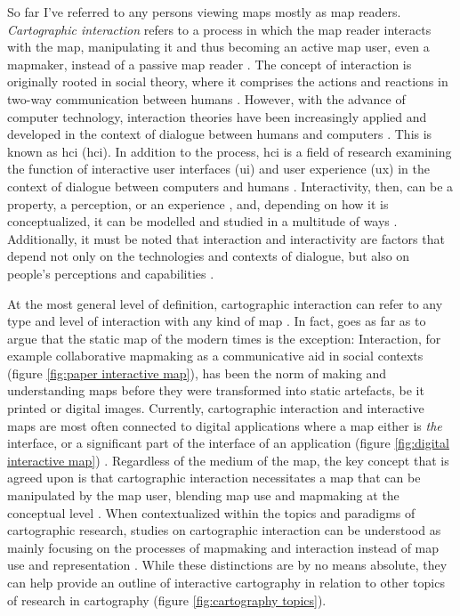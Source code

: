 So far I've referred to any persons viewing maps mostly as map readers.
\textit{Cartographic interaction} refers to a process
in which the map reader interacts with the map,
manipulating it and thus becoming an active map user, even a mapmaker,
instead of a passive map reader \parencite{rot2017}.
The concept of interaction is originally rooted in social theory,
where it comprises the actions and reactions in
two-way communication between humans \parencite{ken1996}.
However, with the advance of computer technology,
interaction theories have been increasingly applied and developed
in the context of dialogue between humans and computers \parencite{qui2008}.
This is known as \acrlong{hci} (\acrshort{hci}).
In addition to the process, \acrshort{hci} is a field of research examining
the function of interactive user interfaces (\acrshort{ui})
and user experience (\acrshort{ux})
in the context of dialogue between computers and humans \parencite{car1997, hor2017}.
Interactivity, then, can be
a property, a perception, or an experience \parencite{lan2023},
and, depending on how it is conceptualized,
it can be modelled and studied in a multitude of ways \parencite{smu2009}.
Additionally, it must be noted that interaction and interactivity are factors
that depend not only on the technologies and
contexts of dialogue, but also on people’s perceptions and capabilities
\parencite{kio2002, duc2018}.

At the most general level of definition,
cartographic interaction can refer to
any type and level of interaction with any kind of map \parencite{pet1998}.
In fact, \citeauthor{pet1998} goes as far as to argue
that the static map of the modern times is the exception:
Interaction, for example collaborative mapmaking
as a communicative aid in social contexts
(figure \ref{fig:paper interactive map}),
has been the norm of making and understanding maps
before they were transformed into static artefacts,
be it printed or digital images.
Currently, cartographic interaction and interactive maps
are most often connected to digital applications
where a map either is \textit{the} interface,
or a significant part of the interface of an application
(figure \ref{fig:digital interactive map}) \parencite{mei2019}.
Regardless of the medium of the map,
the key concept that is agreed upon is that cartographic interaction necessitates
a map that can be manipulated by the map user,
blending map use and mapmaking at the conceptual level \parencite{rot2015}.
When contextualized within the topics and paradigms of cartographic research,
studies on cartographic interaction can be understood as
mainly focusing on the processes of mapmaking and interaction
instead of map use and representation \parencite{rot2013b}.
While these distinctions are by no means absolute,
they can help provide an outline of interactive cartography in
relation to other topics of research in cartography (figure \ref{fig:cartography topics}).

